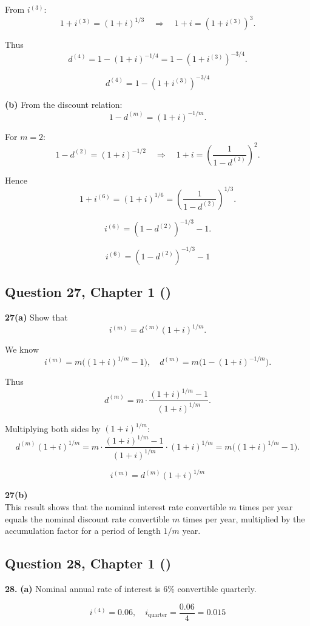 \documentclass[12pt, a4paper]{article}
\begin{document}
From \(i^{(3)}\):
\[
1+i^{(3)} = (1+i)^{1/3} \quad \Rightarrow \quad 1+i = (1+i^{(3)})^3.
\]

Thus
\[
d^{(4)} = 1 - (1+i)^{-1/4} = 1 - (1+i^{(3)})^{-3/4}.
\]

\[
\boxed{d^{(4)} = 1 - (1+i^{(3)})^{-3/4}}
\]

\bigskip

\textbf{(b)} From the discount relation:
\[
1-d^{(m)} = (1+i)^{-1/m}.
\]

For \(m=2\):
\[
1-d^{(2)} = (1+i)^{-1/2} \quad \Rightarrow \quad 1+i = \left(\frac{1}{1-d^{(2)}}\right)^2.
\]

Hence
\[
1+i^{(6)} = (1+i)^{1/6} = \left(\frac{1}{1-d^{(2)}}\right)^{1/3}.
\]

\[
i^{(6)} = (1-d^{(2)})^{-1/3} - 1.
\]

\[
\boxed{i^{(6)} = (1-d^{(2)})^{-1/3} - 1}
\]

\subsection*{Question 27, Chapter 1  (\cite{toi3rd})}

\textbf{27(a)} Show that
\[
i^{(m)} = d^{(m)} (1+i)^{1/m}.
\]

We know
\[
i^{(m)} = m \big( (1+i)^{1/m} - 1 \big),
\quad 
d^{(m)} = m \big( 1 - (1+i)^{-1/m} \big).
\]

Thus
\[
d^{(m)} = m \cdot \frac{(1+i)^{1/m} - 1}{(1+i)^{1/m}}.
\]

Multiplying both sides by \((1+i)^{1/m}\):
\[
d^{(m)} (1+i)^{1/m} 
= m \cdot \frac{(1+i)^{1/m} - 1}{(1+i)^{1/m}} \cdot (1+i)^{1/m}
= m \big( (1+i)^{1/m} - 1 \big).
\]

\[
\boxed{i^{(m)} = d^{(m)} (1+i)^{1/m}}
\]

\bigskip
\textbf{27(b)} \\
This result shows that the nominal interest rate convertible \(m\) times per year
equals the nominal discount rate convertible \(m\) times per year,
multiplied by the accumulation factor for a period of length \(1/m\) year.

\subsection*{Question 28, Chapter 1  (\cite{toi3rd})}

\textbf{28.}
\textbf{(a)} Nominal annual rate of interest is 6\% convertible quarterly.  

\[
i^{(4)} = 0.06, 
\quad i_{\text{quarter}} = \frac{0.06}{4} = 0.015
\]
\end{document}
